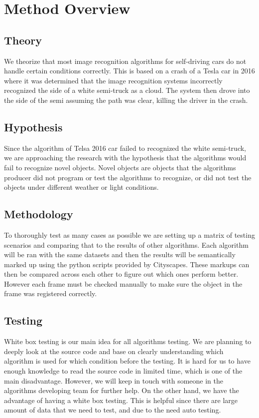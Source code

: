 \documentclass[10pt,draftclsnofoot,onecolumn,journal,compsoc]{IEEEtran}
\begin{document}
\section{Method Overview}

\subsection{Theory}
We theorize that most image recognition algorithms for self-driving cars do not handle certain conditions correctly.
This is based on a crash of a Tesla car in 2016 where it was determined that the image recognition systems incorrectly recognized the side of a white semi-truck as a cloud.
The system then drove into the side of the semi assuming the path was clear, killing the driver in the crash.

\subsection{Hypothesis}
Since the algorithm of Telsa 2016 car failed to recognized the white semi-truck, we are approaching the research with the hypothesis that the algorithms would fail to recognize novel objects. Novel objects are objects that the algorithms producer did not program or test the algorithms to recognize, or did not test the objects under different weather or light conditions. 


\subsection{Methodology}	
To thoroughly test as many cases as possible we are setting up a matrix of testing scenarios and comparing that to the results of other algorithms. 
Each algorithm will be ran with the same datasets and then the results will be semantically marked up using the python scripts provided by Cityscapes. 
These markups can then be compared across each other to figure out which ones perform better.
However each frame must be checked manually to make sure the object in the frame was registered correctly. 

\subsection{Testing}
White box testing is our main idea for all algorithms testing. We are planning to deeply look at the source code and base on clearly understanding which algorithm is used for which condition before the testing. It is hard for us to have enough knowledge to read the source code in limited time, which is one of the main disadvantage. However, we will keep in touch with someone in the algorithms developing team for further help. On the other hand, we have the advantage of having a white box testing. This is helpful since there are large amount of data that we need to test, and due to the need auto testing. 
\end{document}
